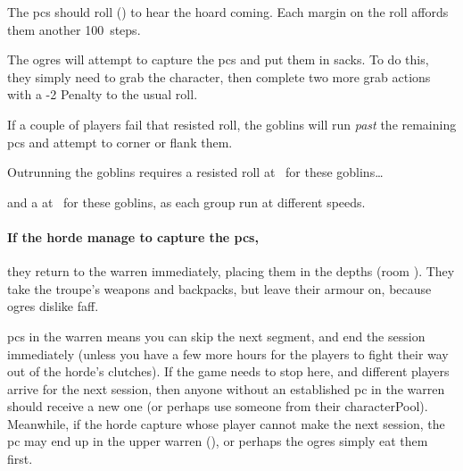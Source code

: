 The \glspl{pc} should roll  (\tn[5]) to hear the hoard coming.
Each margin on the roll affords them another 100~\glspl{step}.

\ogre

\ogre

\ogre

The \glspl{ogre} will attempt to capture the \glspl{pc} and put them in sacks.
To do this, they simply need to grab the character,%
then complete two more grab actions with a -2 Penalty to the usual roll.

If a couple of players fail that resisted  roll, the goblins will run \emph{past} the remaining \glspl{pc} and attempt to corner or flank them.%

\goblin

Outrunning the goblins requires a resisted  roll at \tn\ for these goblins\ldots

\goblin

and a  at \tn\ for these goblins, as each group run at different speeds.

\goblin

\paragraph{If the horde manage to capture the \glspl{pc},}
they return to the \gls{warren} immediately, placing them in the depths (room ).
They take the troupe's weapons and backpacks, but leave their armour on, because \glspl{ogre} dislike faff.

\Glspl{pc} in the \gls{warren} means you can skip the next \gls{segment}, and end the session immediately (unless you have a few more hours for the players to fight their way out of the horde's clutches).
If the game needs to stop here, and different players arrive for the next session, then anyone without an established \gls{pc} in the \gls{warren} should receive a new one (or perhaps use someone from their \gls{characterPool}).
Meanwhile, if the horde capture  whose player cannot make the next session, the \gls{pc} may end up in the upper warren (), or perhaps the \glspl{ogre} simply eat them first.



